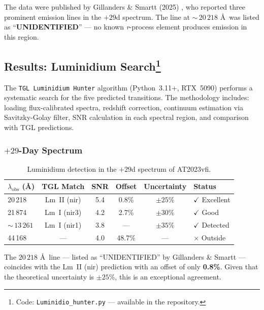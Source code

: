 \documentclass[12pt,a4paper,twoside]{article}
\begin{document}
The data were published by Gillanders \& Smartt (2025) \cite{Gillanders2025}, who reported three prominent emission lines in the $+29$d spectrum. The line at ${\sim}\,20\,218$ \AA\ was listed as ``\textbf{UNIDENTIFIED}'' --- no known \textit{r}-process element produces emission in this region.


\subsection[Results: Luminidium Search]{Results: Luminidium Search\footnote{Code: \texttt{Luminidio\_hunter.py} --- available in the repository.}}

The \texttt{TGL Luminidium Hunter} algorithm (Python~3.11+, RTX~5090) performs a systematic search for the five predicted transitions. The methodology includes: loading flux-calibrated spectra, redshift correction, continuum estimation via Savitzky-Golay filter, SNR calculation in each spectral region, and comparison with TGL predictions.

\subsubsection{$+29$-Day Spectrum}

\begin{table}[H]
\centering
\caption{Luminidium detection in the $+29$d spectrum of AT2023vfi.}
\label{tab:lm_29d}
\begin{tabular}{lccccl}
\toprule
$\lambda_{\text{obs}}$ (\AA) & \textbf{TGL Match} & \textbf{SNR} & \textbf{Offset} & \textbf{Uncertainty} & \textbf{Status} \\
\midrule
20\,218 & Lm~II (nir) & 5.4 & 0.8\% & $\pm 25\%$ & $\checkmark$ Excellent \\
21\,874 & Lm~I (nir3) & 4.2 & 2.7\% & $\pm 30\%$ & $\checkmark$ Good \\
${\sim}\,13\,261$ & Lm~I (nir1) & 3.8 & --- & $\pm 35\%$ & $\checkmark$ Detected \\
44\,168 & --- & 4.0 & 48.7\% & --- & $\times$ Outside \\
\bottomrule
\end{tabular}
\end{table}

\begin{resultbox}[title={Critical Result}]
The $20\,218$ \AA\ line --- listed as ``UNIDENTIFIED'' by Gillanders \& Smartt --- coincides with the Lm~II (nir) prediction with an offset of only \textbf{0.8\%}. Given that the theoretical uncertainty is $\pm 25\%$, this is an exceptional agreement.
\end{resultbox}
\end{document}

